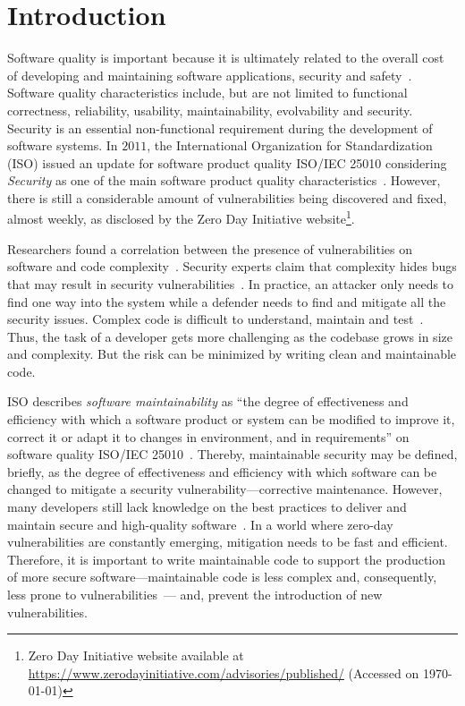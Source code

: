 \documentclass[smallextended]{svjour3}       %
\begin{document}
\section{Introduction}
%
Software quality is important because it is ultimately related to 
the overall cost of developing and maintaining software 
applications, security and safety~\cite{slaughter1998evaluating}. Software quality 
characteristics include, but are not limited to functional 
correctness, reliability, usability, maintainability, evolvability 
and security. Security is an essential non-functional requirement 
during the development of software systems. In $2011$, the 
International Organization for Standardization (ISO) issued an 
update for software product quality ISO/IEC 25010 considering 
\emph{Security} as one of the main software product quality 
characteristics~\cite{iso:2011}. However, there is still 
a considerable amount of vulnerabilities being discovered and fixed, 
almost weekly, as disclosed by the Zero Day Initiative 
website\footnote{Zero Day Initiative website available at 
\url{https://www.zerodayinitiative.com/advisories/published/} 
(Accessed on \today{})}. 

Researchers found a correlation between the presence of 
vulnerabilities on software and code complexity~\cite{shin2010evaluating,10.1145/1774088.1774504}. 
Security experts claim that complexity hides bugs that may result in 
security vulnerabilities~\cite{mcgraw2004software,schneier2006beyond}. In 
practice, an attacker only needs to find one way into the system 
while a defender needs to find and mitigate all the security issues. 
Complex code is difficult to understand, maintain and 
test~\cite{1702388}. Thus, the task of a developer gets more challenging as the 
codebase grows in size and complexity. But the risk can be minimized 
by writing clean and maintainable code. 

ISO describes \textit{software maintainability} as ``the degree of 
effectiveness and efficiency with which a software product or system 
can be modified to improve it, correct it or adapt it to changes in 
environment, and in requirements'' on software quality ISO/IEC 
25010~\cite{iso:2011}. Thereby, maintainable security may be 
defined, briefly, as the degree of effectiveness and efficiency with 
which software can be changed to mitigate a security 
vulnerability---corrective maintenance.
However, many developers still lack knowledge on the best 
practices to deliver and maintain secure and high-quality 
software~\cite{Pothamsetty:2005:SEL:1107622.1107635,8077802}. In a 
world where zero-day vulnerabilities are constantly emerging, 
mitigation needs to be fast and efficient. Therefore, it 
is important to write maintainable code to support the production of 
more secure software---maintainable code is less complex and, 
consequently, less prone to
vulnerabilities~\cite{shin2010evaluating,10.1145/1774088.1774504}---
and, prevent the introduction of new vulnerabilities. 
\end{document}
